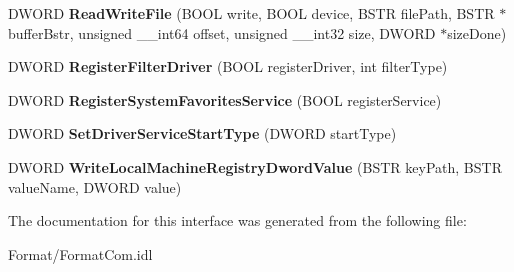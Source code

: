 \begin{DoxyCompactItemize}
D\+W\+O\+RD {\bfseries Read\+Write\+File} (B\+O\+OL write, B\+O\+OL device, B\+S\+TR file\+Path, B\+S\+TR $\ast$buffer\+Bstr, unsigned \+\_\+\+\_\+int64 offset, unsigned \+\_\+\+\_\+int32 size, D\+W\+O\+RD $\ast$size\+Done)
\item 
\mbox{\label{interface_gost_crypt_format_com_1_1_i_gost_crypt_format_com_a5bad48d039fa83506dcb1bb620100eec}} 
D\+W\+O\+RD {\bfseries Register\+Filter\+Driver} (B\+O\+OL register\+Driver, int filter\+Type)
\item 
\mbox{\label{interface_gost_crypt_format_com_1_1_i_gost_crypt_format_com_a67f9d59868dbf6afbb61cfd7136d2593}} 
D\+W\+O\+RD {\bfseries Register\+System\+Favorites\+Service} (B\+O\+OL register\+Service)
\item 
\mbox{\label{interface_gost_crypt_format_com_1_1_i_gost_crypt_format_com_a56eb7846817ec25e0e3222197b4f1453}} 
D\+W\+O\+RD {\bfseries Set\+Driver\+Service\+Start\+Type} (D\+W\+O\+RD start\+Type)
\item 
\mbox{\label{interface_gost_crypt_format_com_1_1_i_gost_crypt_format_com_ad6547b3c6c08337a8635f9497ff3995d}} 
D\+W\+O\+RD {\bfseries Write\+Local\+Machine\+Registry\+Dword\+Value} (B\+S\+TR key\+Path, B\+S\+TR value\+Name, D\+W\+O\+RD value)
\end{DoxyCompactItemize}


The documentation for this interface was generated from the following file\+:\begin{DoxyCompactItemize}
\item 
Format/Format\+Com.\+idl\end{DoxyCompactItemize}
